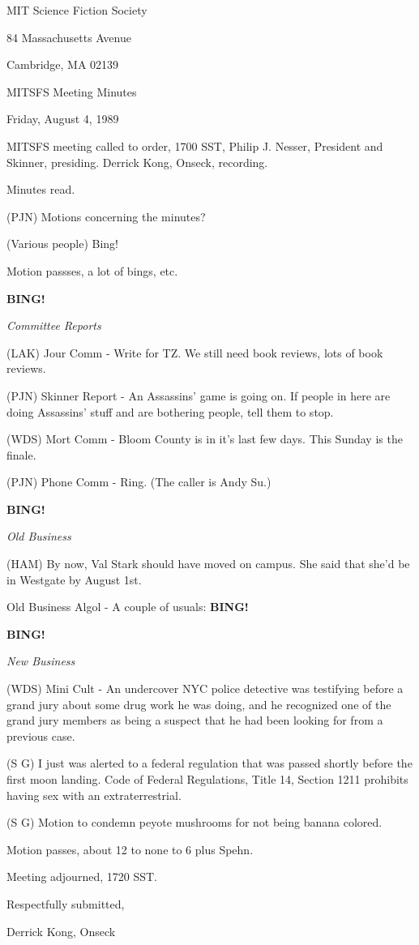 \documentclass[12pt]{article}
\newcommand{\bing}{{\bf BING!} }
\newcommand{\goto}[1]{\bing \vskip 12pt \centerline{{\em{#1}}}}
\begin{document}
\begin{center}

MIT Science Fiction Society 

84 Massachusetts Avenue

Cambridge, MA 02139

\vspace{12pt}

MITSFS Meeting Minutes 

Friday, August 4, 1989

\end{center}
 
\vspace{18pt}

\setlength{\parskip}{6pt}

\noindent
MITSFS meeting called to order, 1700 SST, Philip J. Nesser, President and Skinner, presiding. Derrick Kong, Onseck, recording.

Minutes read.

(PJN) Motions concerning the minutes?

(Various people) Bing!

Motion passses, a lot of bings, etc.

\goto{Committee Reports}

(LAK) Jour Comm - Write for TZ. We still need book reviews, lots of book reviews.

(PJN) Skinner Report - An Assassins' game is going on. If people in here are doing Assassins' stuff and are bothering people, tell them to stop.

(WDS) Mort Comm - Bloom County is in it's last few days.  This Sunday is the finale.

(PJN) Phone Comm - Ring. (The caller is Andy Su.)

\goto{Old Business}

(HAM) By now, Val Stark should have moved on campus.  She said that she'd be in Westgate by August 1st.

Old Business Algol - A couple of usuals: \bing

\goto{New Business}

(WDS) Mini Cult - An undercover NYC police detective was testifying before a grand jury about some drug work he was doing, and he recognized one of the grand jury members as being a suspect that he had been looking for from a previous case.

(S G) I just was alerted to a federal regulation that was passed shortly before the first moon landing. Code of Federal Regulations, Title 14, Section 1211 prohibits having sex with an extraterrestrial.

(S G) Motion to condemn peyote mushrooms for not being banana colored.

Motion passes, about 12 to none to 6 plus Spehn.

\vspace{12pt}

\noindent
Meeting adjourned, 1720 SST.

\vspace{18pt}

\centerline{Respectfully submitted,}
\centerline{Derrick Kong, Onseck}
\end{document}
